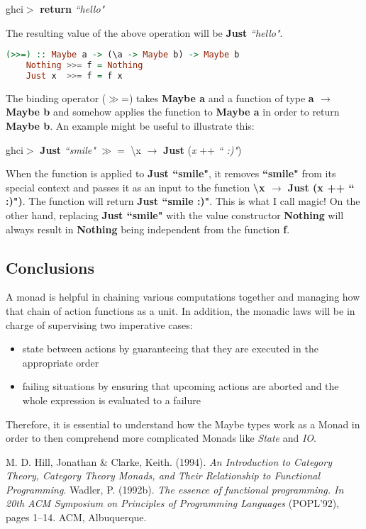 \documentclass[a4paper, onecolumn]{article}
\begin{document}
\begin{center}
    ghci$>$ \textbf{return} \textit{``hello"}
\end{center}
The resulting value of the above operation will be \textbf{Just} \textit{``hello"}.
\begin{tcolorbox}
\begin{lstlisting}[language=Haskell]
    (>>=) :: Maybe a -> (\a -> Maybe b) -> Maybe b
    Nothing >>= f = Nothing
    Just x  >>= f = f x
\end{lstlisting}
\end{tcolorbox}
The binding operator ($\gg$=) takes \textbf{Maybe a} and a function of type \textbf{a $\rightarrow$ Maybe b} and somehow applies the function to \textbf{Maybe a} in order to return \textbf{Maybe b}. An example might be useful to illustrate this: 
\begin{center}
ghci$>$ \textbf{Just} \textit{``smile"} $\gg=$ \textbackslash x $\rightarrow$ \textbf{Just} (\textit{x} ++ \textit{`` :)"})
\end{center}
When the function is applied to \textbf{Just ``smile"}, it removes \textbf{``smile"} from its special context and passes it as an input to the function \textbf{\textbackslash x $\rightarrow$ Just (x ++ `` :)")}.  The function will return \textbf{Just ``smile :)"}. This is what I call magic! On the other hand, replacing \textbf{Just ``smile"} with the value constructor \textbf{Nothing} will always result in \textbf{Nothing} being independent from the function \textbf{f}.


\subsection{Conclusions}
A monad is helpful in chaining various computations together and managing how that chain of action functions as a unit. In addition, the monadic laws will be in charge of supervising two imperative cases:

\begin{itemize}
    \item state between actions by guaranteeing that they are executed in the appropriate order 
    \item failing situations by ensuring that upcoming actions are aborted and the whole expression is evaluated to a failure
\end{itemize}
Therefore, it is essential to understand how the Maybe types work as a Monad in order to then comprehend more complicated Monads like \textit{State} and \textit{IO}.

\begin{thebibliography}{9}
M. D. Hill, Jonathan & Clarke, Keith. (1994). \textit{An Introduction to Category Theory, Category Theory Monads, and Their Relationship to Functional Programming}.
Wadler, P. (1992b). \textit{The essence of functional programming. In
20th ACM Symposium on Principles of Programming Languages}
(POPL’92), pages 1–14. ACM, Albuquerque.
\end{thebibliography}
\end{document}
